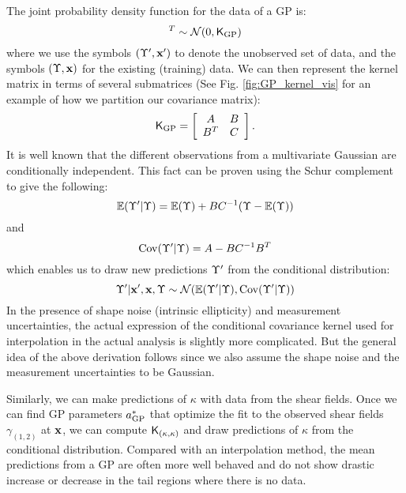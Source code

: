 The joint probability density function for the data of a GP is:
\begin{equation}
	[\lensparams',\lensparams]^T \sim \mathcal{N}(0, \kerngp_{\rm GP})
\end{equation}
where we use the symbols $(\Upsilon', \mathbf{x}')$ to denote the unobserved set of data,
and the symbols $(\Upsilon, \mathbf{x})$ for the existing (training) data.
We can then represent the kernel matrix in terms of several submatrices 
(See Fig. \ref{fig:GP_kernel_vis} for an example of how we partition our
covariance matrix):
\begin{equation}
	\mathsf{K}_{\rm GP} = \left[\begin{array}{cc}
	A & B \\
	B^T & C 
\end{array} \right].	
\end{equation}
It is well known that the different observations from a multivariate Gaussian are 
conditionally independent. This fact can be proven using the Schur complement to give the following:
\begin{equation}
	\mathbb{E}(\Upsilon'|\Upsilon) = \mathbb{E}(\Upsilon) + BC^{-1}(\Upsilon - \mathbb{E}(\Upsilon))
\end{equation}
and
\begin{equation}
	\mathrm{Cov}(\Upsilon'|\Upsilon) = A - BC^{-1}B^T
\end{equation}
which enables us to draw new predictions $\Upsilon'$ from the conditional distribution:
\begin{equation} 
	\Upsilon' | \mathbf{x}', \mathbf{x}, \Upsilon \sim \mathcal{N}(
		\mathbb{E}(\Upsilon'| \Upsilon), \mathrm{Cov}(\Upsilon'|\Upsilon)
	)
\end{equation}
In the presence of shape noise (intrinsic ellipticity) and measurement uncertainties, the actual 
expression of the conditional covariance kernel used for interpolation in the actual analysis 
is slightly more complicated. 
But the general idea of the above derivation follows 
since we also assume the shape noise and the measurement uncertainties to be Gaussian.

Similarly, we can make predictions of $\kappa$ with data from the shear fields. 
Once we can find GP parameters $a_{\rm GP}^*$ that optimize the fit to
the observed shear fields $\gamma_{(1, 2)}$ at $\mathbf{x}$, we can compute $\mathsf{K}_{(\kappa,
\kappa)}$ and draw predictions of $\kappa$ from the conditional distribution. 
Compared with an interpolation method, the mean predictions from a GP are
often more well behaved and do not show drastic increase or decrease 
in the tail regions where there is no data. 

